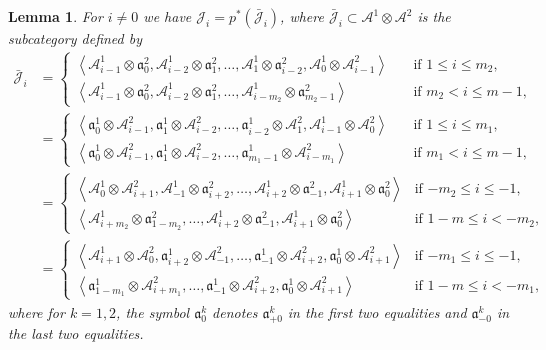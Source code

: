 \documentclass[11pt, reqno]{amsart}
\numberwithin{equation}{section}
\theoremstyle{plain}
\newtheorem{lemma}[theorem]{Lemma}
\theoremstyle{definition}
\newcommand{\barcJ}{\bar{\mathcal{J}}}
\newcommand{\llangle}{\left \langle}
\newcommand{\rrangle}{\right \rangle}
\newcommand{\sotimes}{\otimes}
\newcommand{\cA}{\mathcal{A}}
\newcommand{\cJ}{\mathcal{J}}
\newcommand{\fa}{\mathfrak{a}}
\begin{document}
\begin{lemma}
\label{lemma-Ji-alternate} 
For $i \neq 0$ we have $\cJ_i = p^*(\barcJ_i)$, where $\barcJ_i \subset \cA^1 \otimes \cA^2$ 
is the subcategory defined by 
\allowdisplaybreaks
\begin{align*}
\barcJ_i & = 
\begin{cases}
\llangle \cA^1_{i-1} \sotimes \fa^2_0, \cA^1_{i-2} \sotimes \fa^2_1, \dots, \cA^1_{1} \sotimes \fa^2_{i-2}, \cA^1_0 \sotimes \cA^2_{i-1} \rrangle
& \quad \text{if $1 \le i \le m_2$},\\
\llangle \cA^1_{i-1} \sotimes \fa^2_0, \cA^1_{i-2} \sotimes \fa^2_1, \dots, \cA^1_{i-m_2} \sotimes \fa^2_{m_2-1} \rrangle
& \quad \text{if $m_2 < i \leq m-1$},
\end{cases}
\\ 
& = 
\begin{cases}
\llangle \fa^1_0 \sotimes \cA^2_{i-1}, {\fa^1_1} \sotimes \cA^2_{i-2}, \dots, \fa^1_{i-2} \sotimes \cA^2_{1}, \cA^1_{i-1} \sotimes \cA^2_0 \rrangle
& \quad \text{if $1 \le i \le m_1$},\\
\llangle \fa^1_0 \sotimes \cA^2_{i-1}, {\fa^1_1} \sotimes \cA^2_{i-2}, \dots, \fa^1_{m_1-1} \sotimes \cA^2_{i-m_1} \rrangle
& \quad \text{if $m_1 < i \leq m-1$},
\end{cases} 
\\
& = 
\begin{cases}
\llangle \cA^1_0 \sotimes \cA^2_{i+1}, 
\cA^1_{-1} \sotimes \fa^2_{i+2}, \dots, 
\cA^1_{i+2} \sotimes \fa^2_{-1}, 
\cA^1_{i+1} \sotimes \fa^2_0 \rrangle 
& \text{if $-m_2 \le i \le -1$},\\ 
\llangle \cA^1_{i+m_2} \sotimes \fa^2_{1-m_2}, \dots, 
\cA^1_{i+2} \sotimes \fa^2_{-1}, 
\cA^1_{i+1} \sotimes \fa^2_0 \rrangle 
& \text{if $1-m \leq i < -m_2$},
\end{cases}
\\ 
& = 
\begin{cases}
\llangle  \cA^1_{i+1} \sotimes \cA^2_0,
\fa^1_{i+2} \sotimes \cA^2_{-1} , \dots, 
\fa^1_{-1} \sotimes \cA^2_{i+2}, 
\fa^1_0 \sotimes \cA^2_{i+1}  \rrangle 
& \text{if $-m_1 \le i \le -1$},\\ 
\llangle  \fa^1_{1-m_1} \sotimes \cA^2_{i+m_1} , \dots, 
\fa^1_{-1} \sotimes \cA^2_{i+2}, 
\fa^1_0 \sotimes \cA^2_{i+1}  \rrangle 
& \text{if $1-m \leq i < -m_1$}, 
\end{cases}
\end{align*} 
where for $k =1,2$, the symbol $\fa^k_0$ denotes $\fa^{k}_{+0}$ 
in the first two equalities and $\fa^{k}_{-0}$ in the last two equalities. 
\end{lemma}
\end{document}
